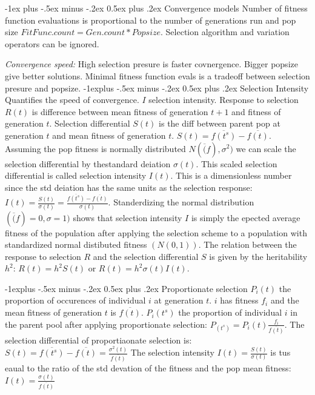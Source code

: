 \documentclass[10pt,landscape]{article}
\makeatletter
\renewcommand{\section}{\@startsection{section}{1}{0mm}%
                                {-1ex plus -.5ex minus -.2ex}%
                                {0.5ex plus .2ex}%
                                {\normalfont\large\bfseries}}
\renewcommand{\subsection}{\@startsection{subsection}{2}{0mm}%
                                {-1explus -.5ex minus -.2ex}%
                                {0.5ex plus .2ex}%
                                {\normalfont\normalsize\bfseries}}
\makeatother
\begin{document}
\begin{multicols}{3}
\section{Convergence models}
Number of fitness function evaluations is proportional to the
number of generations run and pop size $FitFunc.count = Gen.count * Popsize$.
Selection algorithm and variation operators can be ignored.

\emph{Convergence speed:}
High selection presure is faster covnergence. Bigger popsize give better solutions.
Minimal fitness function evals is a tradeoff between selection presure and popsize.
\subsection{Selection Intensity}
Quantifies the speed of convergence. $I$ selection intensity. Response to
selection $R(t)$ is difference between mean fitness of generation $t+1$ and fitness
of generation $t$. Selection differential $S(t)$ is the diff between parent pop
at generation $t$ and mean fitness of generation $t$. 
$S(t)=\overline{f(t^s)}-\overline{f(t)}$. Assuming the pop fitness is normally
distributed $N(\overline(f),\sigma^2)$ we can scale the selection differential
by thestandard deiation $\sigma(t)$. This scaled selection differential is 
called selection intensity $I(t)$. This is a dimensionless number since 
the std deiation has the same units as the selection response:
$I(t)=\frac{S(t)}{\sigma(t)}=\frac{\overline{f(t^s)}-\overline{f(t)}}{\sigma(t)}$.
Standerdizing the normal distribution $(\overline(f)=0,\sigma=1)$ shows that
selection intensity $I$ is simply the epected average fitness
of the population after applying the selection scheme to a population
with standardized normal distibuted fitness $(N(0,1))$.
The relation between the response to selection $R$ and the selection
differential $S$ is given by the heritability $h^2$: $R(t)=h^2S(t)$ or
$R(t)=h^2\sigma(t)I(t)$.

\subsection{Proportionate selection}
$P_i(t)$ the proportion of occurences of individual $i$ at generation $t$.
$i$ has fitness $f_i$ and the mean fitness of generation $t$ is $\overline{f(t)}$.
$P_i(t^s)$ the proportion of individual $i$ in the parent pool
after applying proportionate selection: $P_(t^s)=P_i(t)\frac{f_i}{\overline{f(t)}}$.
The selection differential of proportiaonate selection is: 
$S(t)=\overline{f(t^s)}-\overline{f(t)}=\frac{\sigma^2(t)}{\overline{f(t)}}$
The selection intensity $I(t)=\frac{S(t)}{\sigma(t)}$ is tus eaual
to the ratio of the std devation of the fitness and the pop mean fitness:
$I(t)=\frac{\sigma(t)}{\overline{f(t)}}$


\end{multicols}
\end{document}

